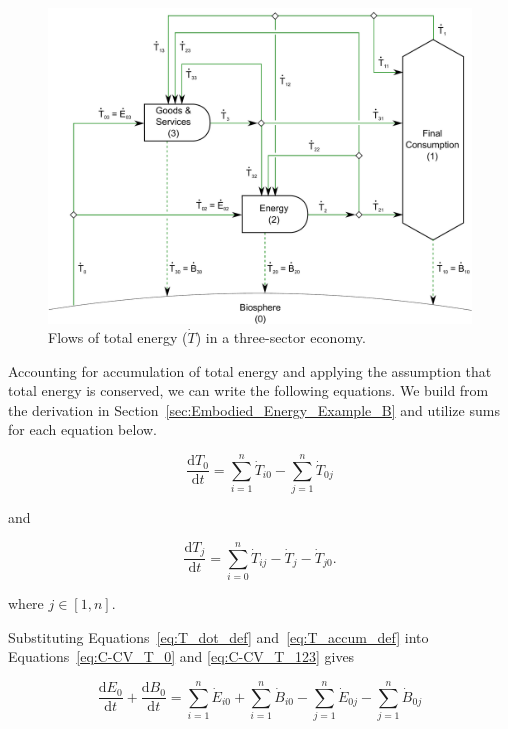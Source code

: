\begin{figure}[!ht]
\includegraphics[width=1.0\linewidth]{Part_1/Chapter_Embodied/images/3_sector_embodied_energy.pdf}
\caption[Flows of total energy in a three-sector economy.]{Flows of total energy ($\dot{T}$) in a three-sector economy.}
\label{fig:C_total_energy}
\end{figure}

Accounting for accumulation of total energy and 
applying the assumption that total energy is conserved, 
we can write the following equations.
We build from the derivation in Section~\ref{sec:Embodied_Energy_Example_B}
and utilize sums for each equation below.

\begin{equation} \label{eq:C-CV_T_0}
	\frac{\mathrm{d}T_{0}}{\mathrm{d}t} 	 
	= \sum\limits_{i=1}^{n} \dot{T}_{i0}
	- \sum\limits_{j=1}^{n} \dot{T}_{0j}
\end{equation}

\noindent and

\begin{equation} \label{eq:C-CV_T_123}
	\frac{\mathrm{d}T_{j}}{\mathrm{d}t} 	 
	= \sum\limits_{i=0}^{n} \dot{T}_{ij}
	- \dot{T}_{j}
	- \dot{T}_{j0}.
\end{equation}

\noindent where $j \in [1, n]$.

Substituting Equations~\ref{eq:T_dot_def} 
and~\ref{eq:T_accum_def} into 
Equations~\ref{eq:C-CV_T_0} and
\ref{eq:C-CV_T_123} gives

\begin{equation} \label{eq:C-CV_dB_0}
	\frac{\mathrm{d}E_{0}}{\mathrm{d}t}
	+ \frac{\mathrm{d}B_{0}}{\mathrm{d}t} 	 
	= \sum\limits_{i=1}^{n} \dot{E}_{i0}
	+ \sum\limits_{i=1}^{n} \dot{B}_{i0}
	- \sum\limits_{j=1}^{n} \dot{E}_{0j}
	- \sum\limits_{j=1}^{n} \dot{B}_{0j}
\end{equation}

